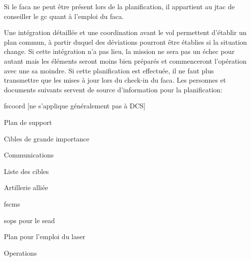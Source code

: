 \begin{e1}
\begin{e2}
		\item Si le \gls{faca} ne peut être présent lors de la planification, il appartient au \gls{jtac} de conseiller le \gls{gc} quant à l'emploi du \gls{faca}.
		\item Une intégration détaillée et une coordination avant le vol permettent d'établir un plan commun, à partir duquel des déviations pourront être établies si la situation change. Si cette intégration n'a pas lieu, la mission ne sera pas un échec pour autant mais les éléments seront moins bien préparés et commenceront l'opération avec une \gls{sa} moindre. Si cette planification est effectuée, il ne faut plus transmettre que les mises à jour lors du check-in du \gls{faca}. Les personnes et documents suivants servent de source d'information pour la planification:
		\begin{e3}
			\item \gls{fscoord} [ne s'applique généralement pas à DCS]
			\begin{e4}[-1em]
				\item Plan de support
				\item Cibles de grande importance
				\item Communications
				\item Liste des cibles
				\item Artillerie alliée
				\item \glspl{fscm}
				\item \glspl{sop} pour le \gls{sead}
				\item Plan pour l'emploi du laser
			\end{e4}
			\begin{e4}
				\item Operations
				\begin{e5}

\end{e5}
\end{e4}
\end{e3}
\end{e2}
\end{e1}
